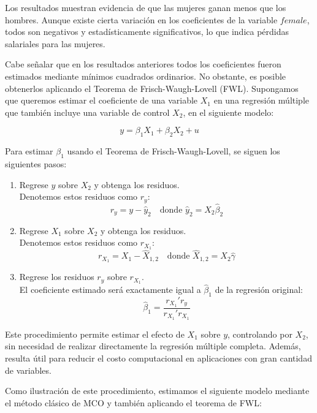 \documentclass[12pt,a4paper,onecolumn]{article}
\begin{document}
Los resultados muestran evidencia de que las mujeres ganan menos que los hombres. Aunque existe cierta variación en los coeficientes de la variable $female$, todos son negativos y estadísticamente significativos, lo que indica pérdidas salariales para las mujeres.

Cabe señalar que en los resultados anteriores todos los coeficientes fueron estimados mediante mínimos cuadrados ordinarios. 
No obstante, es posible obtenerlos aplicando el Teorema de Frisch-Waugh-Lovell (FWL). 
Supongamos que queremos estimar el coeficiente de una variable $X_1$ en una regresión múltiple que también incluye una variable de control $X_2$, en el siguiente modelo:

\[
y = \beta_1 X_1 + \beta_2 X_2 + u
\]

Para estimar $\beta_1$ usando el Teorema de Frisch-Waugh-Lovell, se siguen los siguientes pasos:

\begin{enumerate}
    \item Regrese $y$ sobre $X_2$ y obtenga los residuos.\\
    Denotemos estos residuos como $r_y$:
    \[
    r_y = y - \hat{y}_2 \quad \text{donde } \hat{y}_2 = X_2 \hat{\beta}_2
    \]

    \item Regrese $X_1$ sobre $X_2$ y obtenga los residuos.\\
    Denotemos estos residuos como $r_{X_1}$:
    \[
    r_{X_1} = X_1 - \hat{X}_{1,2} \quad \text{donde } \hat{X}_{1,2} = X_2 \hat{\gamma}
    \]

    \item Regrese los residuos $r_y$ sobre $r_{X_1}$.\\
    El coeficiente estimado será exactamente igual a $\hat{\beta}_1$ de la regresión original:
    \[
    \hat{\beta}_1 = \frac{r_{X_1}' r_y}{r_{X_1}' r_{X_1}}
    \]
\end{enumerate}

Este procedimiento permite estimar el efecto de $X_1$ sobre $y$, controlando por $X_2$, sin necesidad de realizar directamente la regresión múltiple completa. 
Además, resulta útil para reducir el costo computacional en aplicaciones con gran cantidad de variables.

Como ilustración de este procedimiento, estimamos el siguiente modelo mediante el método clásico de MCO y también aplicando el teorema de FWL:
\end{document}
